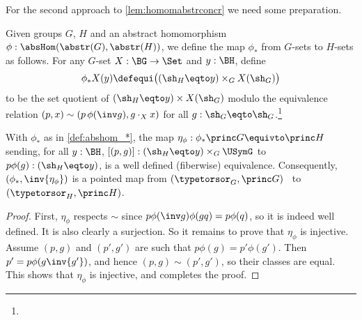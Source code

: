 \label{sec:absconctorsor}

For the second approach to \cref{lem:homomabstrconcr} we need
some preparation.

\begin{definition}\label{def:abshom_*} %
  Given groups $G$, $H$ and an abstract homomorphism
  $\phi:\absHom(\abstr(G),\abstr(H))$, we define the map $\phi_*$
  from $G$-sets to $H$-sets as follows. 
  For any $G$-set $X:\BG\to\Set$ and $y:\BH$, define
  \[
    \phi_*X(y)\defequi \bigl((\sh_H \eqto y) \times_G X(\sh_G)\bigr)
  \]
  to be the set quotient of $(\sh_H\eqto y)\times X(\sh_G)$ modulo
  the equivalence relation $(p,x)\sim(p\, \phi(\inv g),g\cdot_X x)$ for all 
  $g:\sh_G\eqto\sh_G$.\footnote{}
\end{definition}

\begin{lemma}\label{lem:abshom_*}
  With $\phi_*$ as in \cref{def:abshom_*}, the map 
  $\eta_\phi:\phi_*\princ G \equivto \princ H$ sending, for all $y:\BH$,
  $[(p,g)]: (\sh_H \eqto y) \times_G \USymG$ to $p\phi(g):(\sh_H\eqto y)$,
  is a well defined (fiberwise) equivalence. Consequently,
  $(\phi_*,\inv{\eta_\phi})$ is a pointed map from
  $(\typetorsor_G,\princ G)$  to $(\typetorsor_H,\princ H)$.
\end{lemma}
\begin{proof}
First, $\eta_\phi$ respects $\sim$ since
$p\phi(\inv g)\phi(gq) = p\phi(q)$, so it is indeed well defined.
It is also clearly a surjection. So it remains to prove that $\eta_\phi$
is injective. Assume $(p,g)$ and $(p',g')$ are such that
$p\phi(g) = p'\phi(g')$. Then $p'= p\phi(g\inv{g'})$, and
hence $(p,g)\sim(p',g')$, so their classes are equal.
This shows that $\eta_\phi$ is injective, and completes the proof.
\end{proof}

